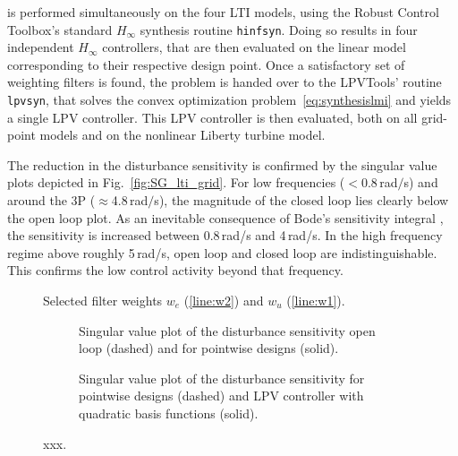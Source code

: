 \documentclass[times]{weauth}
\begin{document}
is performed simultaneously on the four LTI models, using the Robust Control Toolbox's standard $H_\infty$ synthesis routine \texttt{hinfsyn}. Doing so results in four independent $H_\infty$ controllers, that are then evaluated on the linear model corresponding to their respective design point. Once a satisfactory set of weighting filters is found, the problem is handed over to the LPVTools' routine \texttt{lpvsyn}, that solves the convex optimization problem~\eqref{eq:synthesislmi} and yields a single LPV controller. This LPV controller is then evaluated, both on all grid-point models and on the nonlinear Liberty turbine model. 


The reduction in the disturbance sensitivity is confirmed by the singular value
plots depicted in Fig.~\ref{fig:SG_lti_grid}.
For low frequencies  ($<$0.8$\,$rad$/$s) and around the 3P  ($\approx$4.8$\,$rad$/$s), the magnitude of the closed loop lies clearly below the open loop plot. 
As an inevitable consequence of Bode's sensitivity integral \cite{Skoge_05,stein03}, the sensitivity is increased between 0.8\,rad/s and 4\,rad/s. 
In the high frequency regime above roughly 5\,rad/s, open loop and closed loop are indistinguishable. This confirms the low control activity beyond that frequency.
 
\begin{figure}[t] 
	\centering
		
	\caption{Selected filter weights $w_e$ (\ref{line:w2}) and $w_u$
	(\ref{line:w1}).} 
	\label{fig:weights}	
\end{figure}  
  
 
\begin{figure}[t] 
\begin{subfigure}{0.45\linewidth} 
\centering
		 
\caption{Singular value plot of the disturbance sensitivity  open loop (dashed) and for pointwise designs (solid).}
\end{subfigure}
\hfill
\begin{subfigure}{0.45\linewidth}
\centering
		
\caption{Singular value plot of the disturbance sensitivity for pointwise designs (dashed) and LPV controller with quadratic basis functions (solid).}
\end{subfigure}
\caption{xxx.}
\end{figure} 
 
\end{document}
